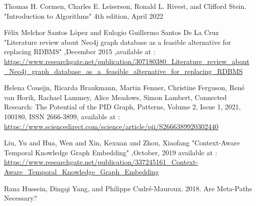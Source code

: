 \documentclass[conference]{IEEEtran}
\begin{document}
\begin{thebibliography}{00}
 Thomas H. Cormen, Charles E. Leiserson, Ronald L. Rivest, and Clifford Stein. "Introduction to Algorithms" 4th edition, April 2022

Félix Melchor Santos López and Eulogio Guillermo Santos De La Cruz "Literature review about Neo4j graph database as a feasible alternative for replacing RDBMS" ,December 2015 ,available at : \url{https://www.researchgate.net/publication/307180380_Literature_review_about_Neo4j_graph_database_as_a_feasible_alternative_for_replacing_RDBMS}


 Helena Cousijn, Ricarda Braukmann, Martin Fenner, Christine Ferguson, René van Horik, Rachael Lammey, Alice Meadows, Simon Lambert,
Connected Research: The Potential of the PID Graph,
Patterns,
Volume 2, Issue 1,
2021,
100180,
ISSN 2666-3899,
available at : \url{https://www.sciencedirect.com/science/article/pii/S2666389920302440}

Liu, Yu and Hua, Wen and Xin, Kexuan and Zhou, Xiaofang "Context-Aware Temporal Knowledge Graph Embedding" ,October, 2019
available at : \url{https://www.researchgate.net/publication/337245161_Context-Aware_Temporal_Knowledge_Graph_Embedding}

Rana Hussein, Dingqi Yang, and Philippe Cudré-Mauroux. 2018. Are Meta-Paths Necessary?





\end{thebibliography}
\end{document}
